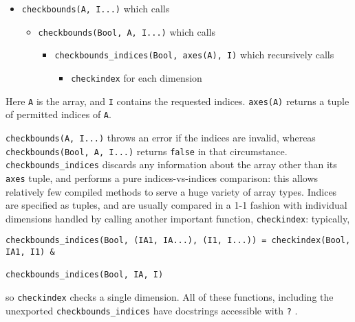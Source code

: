 \begin{itemize}
\item \texttt{checkbounds(A, I...)} which calls

\begin{itemize}
\item \texttt{checkbounds(Bool, A, I...)} which calls

\begin{itemize}
\item \texttt{checkbounds\_indices(Bool, axes(A), I)} which recursively calls

\begin{itemize}
\item \texttt{checkindex} for each dimension

\end{itemize}
\end{itemize}
\end{itemize}
\end{itemize}


Here \texttt{A} is the array, and \texttt{I} contains the {\textquotedbl}requested{\textquotedbl} indices. \texttt{axes(A)} returns a tuple of {\textquotedbl}permitted{\textquotedbl} indices of \texttt{A}.



\texttt{checkbounds(A, I...)} throws an error if the indices are invalid, whereas \texttt{checkbounds(Bool, A, I...)} returns \texttt{false} in that circumstance.  \texttt{checkbounds\_indices} discards any information about the array other than its \texttt{axes} tuple, and performs a pure indices-vs-indices comparison: this allows relatively few compiled methods to serve a huge variety of array types. Indices are specified as tuples, and are usually compared in a 1-1 fashion with individual dimensions handled by calling another important function, \texttt{checkindex}: typically,




\begin{verbatim}
checkbounds_indices(Bool, (IA1, IA...), (I1, I...)) = checkindex(Bool, IA1, I1) &
                                                      checkbounds_indices(Bool, IA, I)
\end{verbatim}



so \texttt{checkindex} checks a single dimension.  All of these functions, including the unexported \texttt{checkbounds\_indices} have docstrings accessible with \texttt{?} .



